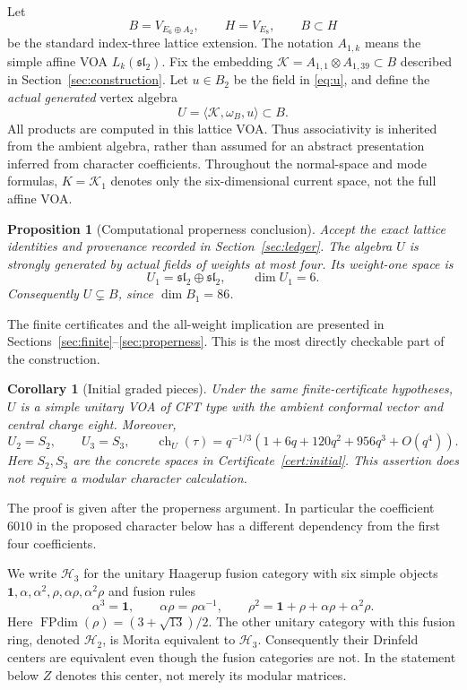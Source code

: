 \documentclass[11pt,a4paper]{article}
\newtheorem{proposition}[theorem]{Proposition}
\newtheorem{corollary}[theorem]{Corollary}
\theoremstyle{definition}
\DeclareMathOperator{\ch}{ch}
\newcommand{\HH}{\mathcal H}
\newcommand{\one}{\mathbf1}
\begin{document}
Let
\[
 B=V_{E_6\oplus A_2},\qquad H=V_{E_8},\qquad B\subset H
\]
be the standard index-three lattice extension. The notation \(A_{1,k}\)
means the simple affine VOA \(L_k(\mathfrak{sl}_2)\). Fix the embedding
\(\mathcal K=A_{1,1}\otimes A_{1,39}\subset B\) described in
Section~\ref{sec:construction}. Let \(u\in B_2\) be the field in
\eqref{eq:u}, and define the \emph{actual generated} vertex algebra
\begin{equation}\label{eq:U}
 U=\langle\mathcal K,\omega_B,u\rangle\subset B.
\end{equation}
All products are computed in this lattice VOA. Thus associativity is
inherited from the ambient algebra, rather than assumed for an abstract
presentation inferred from character coefficients.
Throughout the normal-space and mode formulas, \(K=\mathcal K_1\)
denotes only the six-dimensional current space, not the full affine VOA.

\begin{proposition}[Computational properness conclusion]\label{prop:mainproper}
Accept the exact lattice identities and provenance recorded in
Section~\ref{sec:ledger}. The algebra \(U\) is strongly generated by
actual fields of weights at most four. Its weight-one space is
\[
 U_1=\mathfrak{sl}_2\oplus\mathfrak{sl}_2,\qquad \dim U_1=6.
\]
Consequently \(U\subsetneq B\), since \(\dim B_1=86\).
\end{proposition}
The finite certificates and the all-weight implication are presented in
Sections~\ref{sec:finite}--\ref{sec:properness}. This is the most directly
checkable part of the construction.

\begin{corollary}[Initial graded pieces]\label{cor:initial-grades}
Under the same finite-certificate hypotheses, $U$ is a simple unitary
VOA of CFT type with the ambient conformal vector and central charge
eight. Moreover,
\[
 U_2=S_2,\qquad U_3=S_3,\qquad
 \ch_U(\tau)=q^{-1/3}(1+6q+120q^2+956q^3+O(q^4)).
\]
Here $S_2,S_3$ are the concrete spaces in
Certificate~\ref{cert:initial}. This assertion does not require a modular
character calculation.
\end{corollary}
The proof is given after the properness argument. In particular the
coefficient $6010$ in the proposed character below has a different
dependency from the first four coefficients.

We write $\HH_3$ for the unitary Haagerup fusion category with six
simple objects $\one,\alpha,\alpha^2,\rho,\alpha\rho,\alpha^2\rho$
and fusion rules
\[
 \alpha^3=\one,\qquad \alpha\rho=\rho\alpha^{-1},\qquad
 \rho^2=\one+\rho+\alpha\rho+\alpha^2\rho.
\]
Here $\operatorname{FPdim}(\rho)=(3+\sqrt{13})/2$.
The other unitary category with this fusion ring, denoted $\HH_2$,
is Morita equivalent to $\HH_3$. Consequently their Drinfeld centers
are equivalent even though the fusion categories are not. In the
statement below $Z$ denotes this center, not merely its modular matrices.
\end{document}
